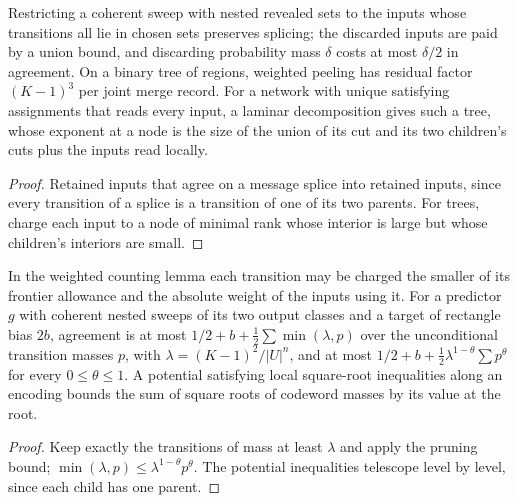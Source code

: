 \begin{theorem}
  \label{thm:lowerbounds-frontier-pruning-tree}
  \leanok
  Restricting a coherent sweep with nested revealed sets to the inputs whose
  transitions all lie in chosen sets preserves splicing; the discarded inputs are
  paid by a union bound, and discarding probability mass $\delta$ costs at most
  $\delta/2$ in agreement. On a binary tree of regions, weighted peeling has
  residual factor $(K-1)^3$ per joint merge record. For a network with unique
  satisfying assignments that reads every input, a laminar decomposition gives
  such a tree, whose exponent at a node is the size of the union of its cut and
  its two children's cuts plus the inputs read locally.
\end{theorem}
\begin{proof}
  \leanok
  Retained inputs that agree on a message splice into retained inputs, since
  every transition of a splice is a transition of one of its two parents. For
  trees, charge each input to a node of minimal rank whose interior is large but
  whose children's interiors are small.
\end{proof}

\begin{theorem}
  \label{thm:lowerbounds-frontier-capacity}
  \leanok
  In the weighted counting lemma each transition may be charged the smaller of its
  frontier allowance and the absolute weight of the inputs using it. For a
  predictor $g$ with coherent nested sweeps of its two output classes and a target
  of rectangle bias $2b$, agreement is at most
  $1/2+b+\tfrac12\sum\min(\lambda,p)$ over the unconditional transition masses $p$,
  with $\lambda=(K-1)^2/|U|^n$, and at most
  $1/2+b+\tfrac12\lambda^{1-\theta}\sum p^\theta$ for every $0\le\theta\le1$.
  A potential satisfying local square-root inequalities along an encoding bounds
  the sum of square roots of codeword masses by its value at the root.
\end{theorem}
\begin{proof}
  \leanok
  Keep exactly the transitions of mass at least $\lambda$ and apply the pruning
  bound; $\min(\lambda,p)\le\lambda^{1-\theta}p^\theta$. The potential inequalities
  telescope level by level, since each child has one parent.
\end{proof}


